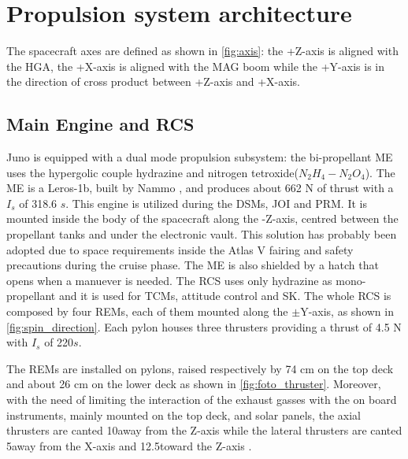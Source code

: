 \section{Propulsion system architecture}
\label{sec:prop_architecture}


The spacecraft axes are defined as shown in \autoref{fig:axis}: the +Z-axis is aligned with the HGA, the +X-axis is aligned with the MAG boom while the +Y-axis is in the direction of cross product between +Z-axis and +X-axis.


\subsection{Main Engine and RCS}
\label{sec:me and rcs}
Juno is equipped with a dual mode propulsion subsystem: the bi-propellant ME uses the hypergolic couple hydrazine and nitrogen tetroxide($N_2H_4 - N_2O_4$).
The ME is a Leros-1b, built by Nammo \cite{Leros}, and produces about 662 N of thrust with a $I_s$ of 318.6 $s$. This engine is utilized during the DSMs, JOI and PRM. It is mounted inside the body of the spacecraft along the -Z-axis, centred between the propellant tanks and under the electronic vault. This solution has probably been adopted due to space requirements inside the Atlas V fairing and safety precautions during the cruise phase. The ME is also shielded by a hatch that opens when a manuever is needed.
The RCS uses only hydrazine as mono-propellant and it is used for TCMs, attitude control and SK. The whole RCS is composed by four REMs, each of them mounted along the $\pm$Y-axis, as shown in \autoref{fig:spin_direction}. Each pylon houses three thrusters providing a thrust of 4.5 N with $I_s$ of 220$s$. 


The REMs are installed on pylons, raised respectively by 74 cm on the top deck and about 26 cm on the lower deck as shown in \autoref{fig:foto_thruster}. Moreover, with the need of limiting the interaction of the exhaust gasses with the on board instruments, mainly mounted on the top deck, and solar panels, the axial thrusters are canted 10\textdegree away from the Z-axis while the lateral thrusters are canted 5\textdegree away from the X-axis and 12.5\textdegree toward the Z-axis \cite{junno_inner}.
